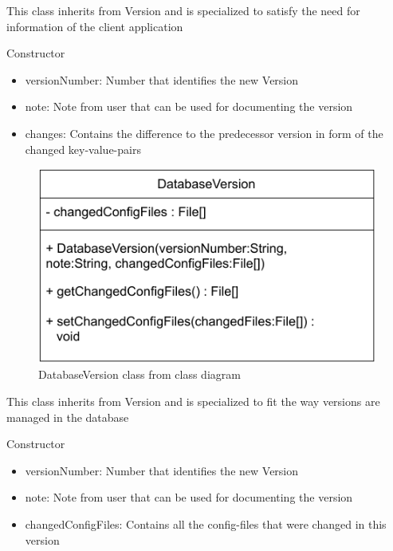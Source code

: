This class inherits from Version and is specialized to satisfy the need for information of the client application
\begin{methodenv}{Constructor}



\begin{itemize}
	\item{versionNumber:}
	Number that identifies the new Version
	\item{note:}
	Note from user that can be used for documenting the version
	\item{changes:}
	Contains the difference to the predecessor version in form of the changed key-value-pairs
\end{itemize}
\end{methodenv}

\begin{figure}[h]
\centerline{\includegraphics[scale=1]{res/Klassen/DatabaseVersion.pdf}}
\caption{DatabaseVersion class from class diagram}
\end{figure}

This class inherits from Version and is specialized to fit the way versions are managed in the database
\begin{methodenv}{Constructor}



\begin{itemize}
	\item{versionNumber:}
	Number that identifies the new Version
	\item{note:}
	Note from user that can be used for documenting the version
	\item{changedConfigFiles:}
	Contains all the config-files that were changed in this version
\end{itemize}
\end{methodenv}

